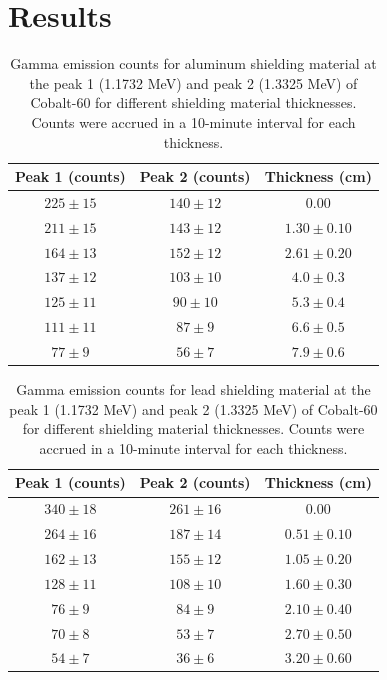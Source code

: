 \documentclass[11pt]{article}
\begin{document}
\section{Results}

\begin{table}[H]
  \centering
  \begin{tabular}{|c|c|c|}
    \hline
    Peak 1 (counts) & Peak 2 (counts) & Thickness (cm) \\
    \hline
    $225 \pm 15$ & $140 \pm 12$ & $0.00$ \\
    $211 \pm 15$ & $143 \pm 12$ & $1.30 \pm 0.10$ \\
    $164 \pm 13$ & $152 \pm 12$ & $2.61 \pm 0.20$ \\
    $137 \pm 12$ & $103 \pm 10$ & $4.0 \pm 0.3$ \\
    $125 \pm 11$ & $90 \pm 10$ & $5.3 \pm 0.4$ \\
    $111 \pm 11$ & $87 \pm 9$ & $6.6 \pm 0.5$ \\
    $77 \pm 9$ & $56 \pm 7$ & $7.9 \pm 0.6$ \\
    \hline
  \end{tabular}
  \label{tab:al_data}
  \caption{Gamma emission counts for aluminum shielding material at
    the peak 1 (1.1732 MeV) and peak 2 (1.3325 MeV) \cite{nudat} of
    Cobalt-60 for
    different shielding material thicknesses. Counts were accrued
    in a 10-minute
  interval for each thickness.}
\end{table}

\begin{table}[H]
  \centering
  \begin{tabular}{|c|c|c|}
    \hline
    Peak 1 (counts) & Peak 2 (counts) & Thickness (cm) \\
    \hline
    $340 \pm 18$ & $261 \pm 16$ & $0.00$ \\
    $264 \pm 16$ & $187 \pm 14$ & $0.51 \pm 0.10$ \\
    $162 \pm 13$ & $155 \pm 12$ & $1.05 \pm 0.20$ \\
    $128 \pm 11$ & $108 \pm 10$ & $1.60 \pm 0.30$ \\
    $76 \pm 9$ & $84 \pm 9$ & $2.10 \pm 0.40$ \\
    $70 \pm 8$ & $53 \pm 7$ & $2.70 \pm 0.50$ \\
    $54 \pm 7$ & $36 \pm 6$ & $3.20 \pm 0.60$ \\
    \hline
  \end{tabular}
  \caption{Gamma emission counts for lead shielding material at
    the peak 1 (1.1732 MeV) and peak 2 (1.3325 MeV) of Cobalt-60 for
    different shielding material thicknesses. Counts were accrued
    in a 10-minute
  interval for each thickness.}
  \label{tab:pb_data}
\end{table}
\end{document}
